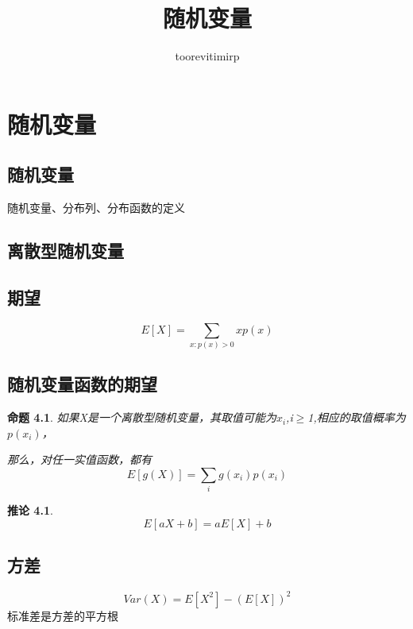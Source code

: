 \documentclass[a4paper]{book}
\title{随机变量}
\author{toorevitimirp}
\newtheorem{lemma}{命题}[chapter]
\newtheorem{corollary}{推论}[chapter]
\begin{document}
\chapter{}
\chapter{}
\chapter{}
\chapter{随机变量}
    \section{随机变量}
        随机变量、分布列、分布函数的定义
    \section{离散型随机变量}
    \section{期望}
        \begin{equation*}
            E[X] = \sum_{x:p(x)>0}xp(x)
        \end{equation*}
    \section{随机变量函数的期望}
        \begin{lemma}
            如果X是一个离散型随机变量，其取值可能为$x_i$,i$\geq$1,相应的取值概率为$p(x_i)$，
            
            那么，对任一实值函数，都有
            \begin{equation*}
                E[g(X)] = \sum_ig(x_i)p(x_i)
            \end{equation*}
        \end{lemma}

        \begin{corollary}
            \begin{equation*}
                E[aX + b] = aE[X] + b
            \end{equation*}
        \end{corollary}

    \section{方差}
        \begin{equation*}
            Var(X) = E[X^2] - (E[X])^2
        \end{equation*}
        标准差是方差的平方根
\end{document}
